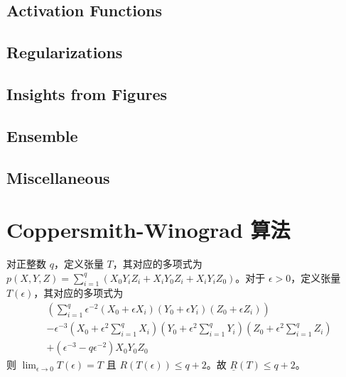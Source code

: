 \documentclass[11pt,fleqn, UTF8]{ctexbook} %
\begin{document}
\begin{itemize}
\end{itemize}
\subsection{Activation Functions}
\subsection{Regularizations}
\subsection{Insights from Figures}
\subsection{Ensemble}
\subsection{Miscellaneous}
\section{Coppersmith-Winograd 算法}
对正整数 $q$，定义张量 $T$，其对应的多项式为 $p(X,Y,Z)=\sum_{i=1}^q (X_0Y_iZ_i+X_iY_0Z_i+X_iY_iZ_0)$。对于 $\epsilon>0$，定义张量 $T(\epsilon)$，其对应的多项式为
\begin{align}
&\left(\sum_{i=1}^q \epsilon^{-2} (X_0+\epsilon X_i)(Y_0+\epsilon Y_i)(Z_0+\epsilon Z_i)\right)\\
&-\epsilon^{-3}\left(X_0+\epsilon^2\sum_{i=1}^q X_i\right)\left(Y_0+\epsilon^2\sum_{i=1}^q Y_i\right)\left(Z_0+\epsilon^2\sum_{i=1}^q Z_i\right)\\
&+\left(\epsilon^{-3}-q\epsilon^{-2}\right)X_0Y_0Z_0
\end{align}
则 $\lim_{\epsilon\to 0} T(\epsilon)=T$ 且 $R(T(\epsilon))\leq q+2$。故 $\underline{R}(T)\leq q+2$。
\end{document}
